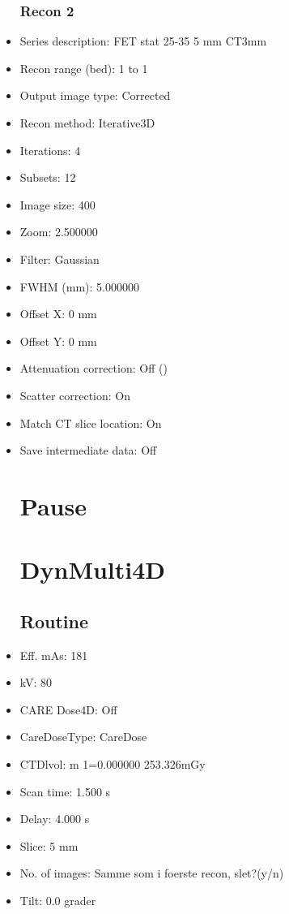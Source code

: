 \documentclass[12pt]{article}
\begin{document}
\begin{itemize}
\subsubsection{Recon 2}
\item Series description: FET stat 25-35 5 mm CT3mm
\item Recon range (bed): 1 to 1
\item Output image type: Corrected
\item Recon method: Iterative3D
\item Iterations: 4
\item Subsets: 12
\item Image size: 400
\item Zoom: 2.500000
\item Filter: Gaussian
\item FWHM (mm): 5.000000
\item Offset X: 0 mm
\item Offset Y: 0 mm
\item Attenuation correction: Off ()
\item Scatter correction: On
\item Match CT slice location: On
\item Save intermediate data: Off
\section{Pause}

\section{DynMulti4D}
\subsection{Routine}
\item Eff. mAs: 181\item kV: 80\item CARE Dose4D: Off\item CareDoseType: CareDose\item CTDlvol: m 1=0.000000 253.326mGy\item Scan time: 1.500 s\item Delay: 4.000 s\item Slice: 5 mm\item No. of images: Samme som i foerste recon, slet?(y/n)\item Tilt: 0.0 grader

\end{itemize}
\end{document}
